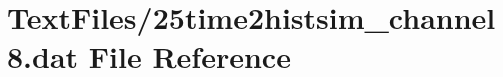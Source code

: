 \hypertarget{25time2histsim__channel8_8dat}{}\section{Text\+Files/25time2histsim\+\_\+channel8.dat File Reference}
\label{25time2histsim__channel8_8dat}
